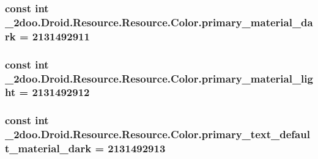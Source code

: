 \hypertarget{class__2doo_1_1_droid_1_1_resource_1_1_color_a606a64bd9a1e60d5608e7729969c128}{
\subsubsection[{primary\_\-material\_\-dark}]{\setlength{\rightskip}{0pt plus 5cm}const int \_\-2doo.Droid.Resource.Resource.Color.primary\_\-material\_\-dark = 2131492911}}
\label{class__2doo_1_1_droid_1_1_resource_1_1_color_a606a64bd9a1e60d5608e7729969c128}


\hypertarget{class__2doo_1_1_droid_1_1_resource_1_1_color_a23bc2b4a475886d9c64f24eb421b4c0}{
\subsubsection[{primary\_\-material\_\-light}]{\setlength{\rightskip}{0pt plus 5cm}const int \_\-2doo.Droid.Resource.Resource.Color.primary\_\-material\_\-light = 2131492912}}
\label{class__2doo_1_1_droid_1_1_resource_1_1_color_a23bc2b4a475886d9c64f24eb421b4c0}


\hypertarget{class__2doo_1_1_droid_1_1_resource_1_1_color_4f3d4315608d2c775b8dd5c72f0a0df3}{
\subsubsection[{primary\_\-text\_\-default\_\-material\_\-dark}]{\setlength{\rightskip}{0pt plus 5cm}const int \_\-2doo.Droid.Resource.Resource.Color.primary\_\-text\_\-default\_\-material\_\-dark = 2131492913}}
\label{class__2doo_1_1_droid_1_1_resource_1_1_color_4f3d4315608d2c775b8dd5c72f0a0df3}


